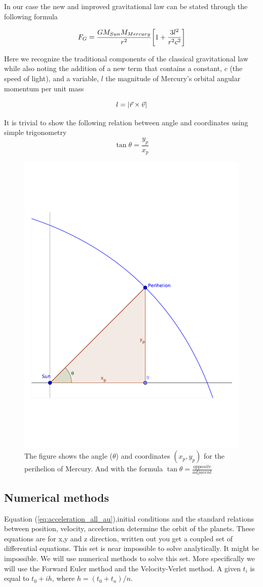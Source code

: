 In our case the new and improved gravitational law can be stated through the following formula

$$F_G = \frac{GM_{Sun}M_{Mercury}}{r^2}\qty[1 + \frac{3l^2}{r^2c^2}]$$

Here we recognize the traditional components of the classical gravitational law while also noting the addition of a new term that contains a constant, $c$ (the speed of light), and a variable, $l$ the magnitude of Mercury's orbital angular momentum per unit mass

$$
l = \abs{\vec{r}\times \vec{v}}
$$

It is trivial to show the following relation between angle and coordinates using simple trigonometry
$$\tan \theta = \frac{y_p}{x_p}$$

\begin{figure}[H]
	\centering
	\includegraphics[width = 0.4\linewidth]{theory/bilder/figure.pdf}
	\caption{The figure shows the angle ($\theta$) and coordinates $(x_p,y_p)$ for the perihelion of Mercury. And with the formula $\tan \theta = \frac{opposite}{adjacent}$}
\end{figure}






\subsection{Numerical methods}

Equation (\ref{eq:acceleration_all_au}),initial conditions and the standard relations between position, velocity, acceleration determine the orbit of the planets. These equations are for x,y and z direction, written out you get a coupled set of differential equations. This set is near impossible to solve analytically. It might be impossible. We will use numerical methods to solve this set. More specifically we will use the Forward Euler method and the Velocity-Verlet method. A given $t_i$ is equal to $t_0 + ih$, where $h = (t_{0} + t_{n})/n $.













